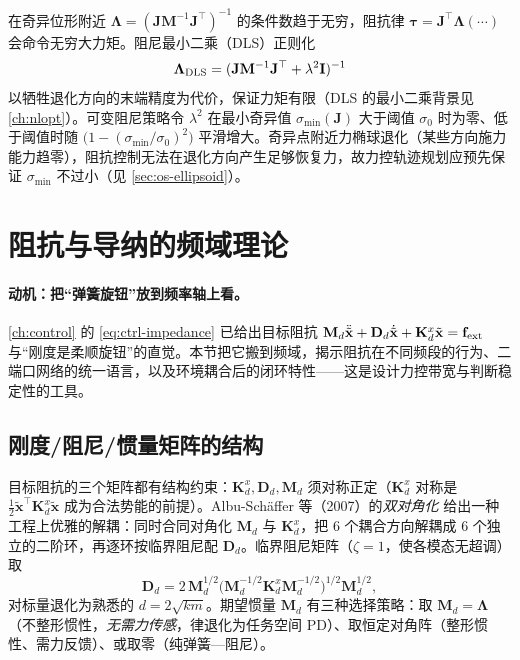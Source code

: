 在奇异位形附近 $\boldsymbol\Lambda=(\mathbf J\mathbf M^{-1}\mathbf J^\top)^{-1}$ 的条件数趋于无穷，阻抗律 $\boldsymbol\tau=\mathbf J^\top\boldsymbol\Lambda(\cdots)$ 会命令无穷大力矩。阻尼最小二乘（DLS）正则化
\begin{equation}
  \boldsymbol\Lambda_{\rm DLS}=(\mathbf J\mathbf M^{-1}\mathbf J^\top+\lambda^2\mathbf I)^{-1}
  \label{eq:os-dls}
\end{equation}
以牺牲退化方向的末端精度为代价，保证力矩有限（DLS 的最小二乘背景见 \cref{ch:nlopt}）。可变阻尼策略令 $\lambda^2$ 在最小奇异值 $\sigma_{\min}(\mathbf J)$ 大于阈值 $\sigma_0$ 时为零、低于阈值时随 $\bigl(1-(\sigma_{\min}/\sigma_0)^2\bigr)$ 平滑增大。奇异点附近力椭球退化（某些方向施力能力趋零），阻抗控制无法在退化方向产生足够恢复力，故力控轨迹规划应预先保证 $\sigma_{\min}$ 不过小（见 \cref{sec:os-ellipsoid}）。

\section{阻抗与导纳的频域理论}
\label{sec:os-frequency}

\paragraph{动机：把“弹簧旋钮”放到频率轴上看。}
\cref{ch:control} 的 \cref{eq:ctrl-impedance} 已给出目标阻抗 $\mathbf M_d\ddot{\tilde{\mathbf x}}+\mathbf D_d\dot{\tilde{\mathbf x}}+\mathbf K_d^x\tilde{\mathbf x}=\mathbf f_{\rm ext}$ 与“刚度是柔顺旋钮”的直觉。本节把它搬到频域，揭示阻抗在不同频段的行为、二端口网络的统一语言，以及环境耦合后的闭环特性——这是设计力控带宽与判断稳定性的工具。

\subsection{刚度/阻尼/惯量矩阵的结构}
\label{sec:os-matrices}

目标阻抗的三个矩阵都有结构约束：$\mathbf K_d^x,\mathbf D_d,\mathbf M_d$ 须对称正定（$\mathbf K_d^x$ 对称是 $\frac12\tilde{\mathbf x}^\top\mathbf K_d^x\tilde{\mathbf x}$ 成为合法势能的前提）。Albu-Sch\"affer 等（2007）的\emph{双对角化}\cite{albuschaffer2007unified} 给出一种工程上优雅的解耦：同时合同对角化 $\mathbf M_d$ 与 $\mathbf K_d^x$，把 $6$ 个耦合方向解耦成 $6$ 个独立的二阶环，再逐环按临界阻尼配 $\mathbf D_d$。临界阻尼矩阵（$\zeta=1$，使各模态无超调）取
\begin{equation}
  \mathbf D_d=2\,\mathbf M_d^{1/2}\bigl(\mathbf M_d^{-1/2}\mathbf K_d^x\mathbf M_d^{-1/2}\bigr)^{1/2}\mathbf M_d^{1/2},
  \label{eq:os-critical-damping}
\end{equation}
对标量退化为熟悉的 $d=2\sqrt{km}$。期望惯量 $\mathbf M_d$ 有三种选择策略：取 $\mathbf M_d=\boldsymbol\Lambda$（不整形惯性，\emph{无需力传感}，律退化为任务空间 PD）、取恒定对角阵（整形惯性、需力反馈）、或取零（纯弹簧—阻尼）。

